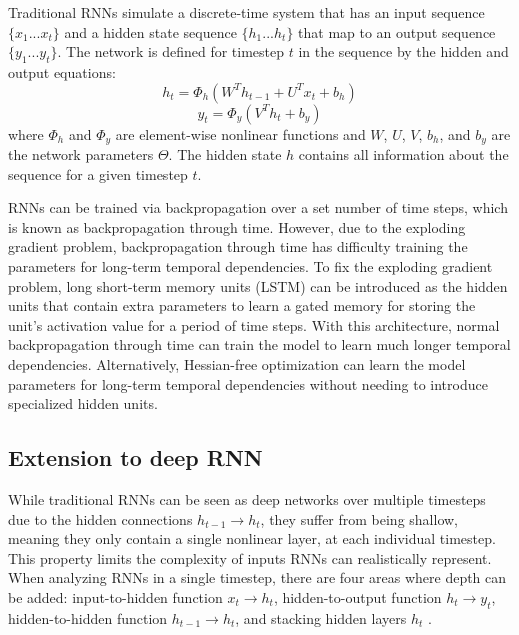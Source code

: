 Traditional RNNs simulate a discrete-time system that has an input sequence \(\{x_1...x_t\}\) and a hidden state sequence \(\{h_1...h_t\}\) that map to an output sequence \(\{y_1...y_t\}\). The network is defined for timestep \(t\) in the sequence by the hidden and output equations:
\begin{equation}
	h_t = \Phi_h(W^Th_{t-1} + U^Tx_t + b_h)
\end{equation}
\begin{equation}
	y_t = \Phi_y(V^Th_t + b_y)
\end{equation}
where \(\Phi_h\) and \(\Phi_y\) are element-wise nonlinear functions and \(W\), \(U\), \(V\), \(b_h\), and \(b_y\) are the network parameters \(\Theta\). The hidden state \(h\) contains all information about the sequence for a given timestep \(t\).

RNNs can be trained via backpropagation over a set number of time steps, which is known as backpropagation through time. However, due to the exploding gradient problem, backpropagation through time has difficulty training the parameters for long-term temporal dependencies. To fix the exploding gradient problem, long short-term memory units (LSTM) \cite{lstm} can be introduced as the hidden units that contain extra parameters to learn a gated memory for storing the unit's activation value for a period of time steps. With this architecture, normal backpropagation through time can train the model to learn much longer temporal dependencies. Alternatively, Hessian-free optimization \cite{hessian_free} can learn the model parameters for long-term temporal dependencies without needing to introduce specialized hidden units.

\subsection{Extension to deep RNN}\label{deep_rnn}
While traditional RNNs can be seen as deep networks over multiple timesteps due to the hidden connections \(h_{t-1} \rightarrow h_t\), they suffer from being shallow, meaning they only contain a single nonlinear layer, at each individual timestep. This property limits the complexity of inputs RNNs can realistically represent. When analyzing RNNs in a single timestep, there are four areas where depth can be added: input-to-hidden function \(x_t \rightarrow h_t\), hidden-to-output function \(h_t \rightarrow y_t\), hidden-to-hidden function \(h_{t-1} \rightarrow h_t\), and stacking hidden layers \(h_t\) \cite{deep_rnn}.

